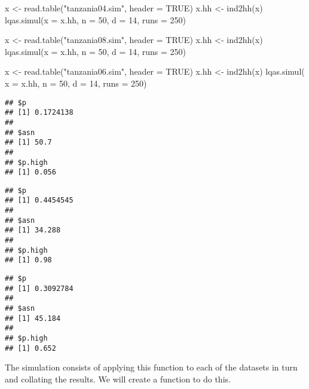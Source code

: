 \documentclass[
  12pt,
  a4paper]{book}
\newenvironment{Shaded}{\begin{snugshade}}{\end{snugshade}}
\newcommand{\AttributeTok}[1]{\textcolor[rgb]{0.77,0.63,0.00}{#1}}
\newcommand{\ConstantTok}[1]{\textcolor[rgb]{0.00,0.00,0.00}{#1}}
\newcommand{\DecValTok}[1]{\textcolor[rgb]{0.00,0.00,0.81}{#1}}
\newcommand{\FunctionTok}[1]{\textcolor[rgb]{0.00,0.00,0.00}{#1}}
\newcommand{\NormalTok}[1]{#1}
\newcommand{\OtherTok}[1]{\textcolor[rgb]{0.56,0.35,0.01}{#1}}
\newcommand{\StringTok}[1]{\textcolor[rgb]{0.31,0.60,0.02}{#1}}
\begin{document}
\begin{Shaded}
\begin{Highlighting}[]
\NormalTok{x }\OtherTok{\textless{}{-}} \FunctionTok{read.table}\NormalTok{(}\StringTok{"tanzania04.sim"}\NormalTok{, }\AttributeTok{header =} \ConstantTok{TRUE}\NormalTok{)}
\NormalTok{x.hh }\OtherTok{\textless{}{-}} \FunctionTok{ind2hh}\NormalTok{(x)}
\FunctionTok{lqas.simul}\NormalTok{(}\AttributeTok{x =}\NormalTok{ x.hh, }\AttributeTok{n =} \DecValTok{50}\NormalTok{, }\AttributeTok{d =} \DecValTok{14}\NormalTok{, }\AttributeTok{runs =} \DecValTok{250}\NormalTok{)}

\NormalTok{x }\OtherTok{\textless{}{-}} \FunctionTok{read.table}\NormalTok{(}\StringTok{"tanzania08.sim"}\NormalTok{, }\AttributeTok{header =} \ConstantTok{TRUE}\NormalTok{)}
\NormalTok{x.hh }\OtherTok{\textless{}{-}} \FunctionTok{ind2hh}\NormalTok{(x)}
\FunctionTok{lqas.simul}\NormalTok{(}\AttributeTok{x =}\NormalTok{ x.hh, }\AttributeTok{n =} \DecValTok{50}\NormalTok{, }\AttributeTok{d =} \DecValTok{14}\NormalTok{, }\AttributeTok{runs =} \DecValTok{250}\NormalTok{)}

\NormalTok{x }\OtherTok{\textless{}{-}} \FunctionTok{read.table}\NormalTok{(}\StringTok{"tanzania06.sim"}\NormalTok{, }\AttributeTok{header =} \ConstantTok{TRUE}\NormalTok{)}
\NormalTok{x.hh }\OtherTok{\textless{}{-}} \FunctionTok{ind2hh}\NormalTok{(x)}
\FunctionTok{lqas.simul}\NormalTok{( }\AttributeTok{x =}\NormalTok{ x.hh, }\AttributeTok{n =} \DecValTok{50}\NormalTok{, }\AttributeTok{d =} \DecValTok{14}\NormalTok{, }\AttributeTok{runs =} \DecValTok{250}\NormalTok{)}
\end{Highlighting}
\end{Shaded}

\begin{verbatim}
## $p
## [1] 0.1724138
## 
## $asn
## [1] 50.7
## 
## $p.high
## [1] 0.056
\end{verbatim}

\begin{verbatim}
## $p
## [1] 0.4454545
## 
## $asn
## [1] 34.288
## 
## $p.high
## [1] 0.98
\end{verbatim}

\begin{verbatim}
## $p
## [1] 0.3092784
## 
## $asn
## [1] 45.184
## 
## $p.high
## [1] 0.652
\end{verbatim}

The simulation consists of applying this function to each of the datasets in turn and collating the results. We will create a function to do this.
\end{document}
